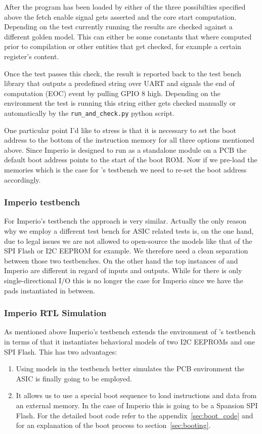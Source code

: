 After the program has been loaded by either of the three possibilties specified above the fetch enable signal gets asserted and the core start computation. Depending on the test currently running the results are checked against a different golden model. This can either be some constants that where computed prior to compilation or other entities that get checked, for example a certain register's content. 

Once the test passes this check, the result is reported back to the test bench library that outputs a predefined string over UART and signals the end of computation (EOC) event by pulling GPIO 8 high. Depending on the environment the test is running this string either gets checked manually or automatically by the \verb+run_and_check.py+ python script.

One particular point I'd like to stress is that it is necessary to set the boot address to the bottom of the instruction memory for all three options mentioned above. Since Imperio is designed to run as a standalone module on a PCB the default boot address points to the start of the boot ROM. Now if we pre-load the memories which is the case for \pulpino's testbench we need to re-set the boot address accordingly.

\subsubsection{Imperio testbench}

For Imperio's testbench the approach is very similar. Actually the only reason why we employ a different test bench for ASIC related tests is, on the one hand, due to legal issues we are not allowed to open-source the models like that of the SPI Flash or I2C EEPROM for example. We therefore need a clean separation between those two testbenches. On the other hand the top instances of \pulpino and Imperio are different in regard of inputs and outputs. While for \pulpino there is only single-directional I/O this is no longer the case for Imperio since we have the pads instantiated in between.

\subsubsection{Imperio RTL Simulation}

As mentioned above Imperio's testbench extends the environment of \pulpino's testbench in terms of that it instantiates behavioral models of two I2C EEPROMs and one SPI Flash. This has two advantages:
\begin{enumerate}
    \item Using models in the testbench better simulates the PCB environment the ASIC is finally going to be employed.
    \item It allows us to use a special boot sequence to load instructions and data from an external memory. In the case of Imperio this is going to be a Spansion SPI Flash. For the detailed boot code refer to the appendix~\ref{sec:boot_code} and for an explanation of the boot process to section~\ref{sec:booting}.
\end{enumerate}


